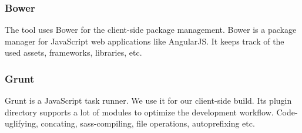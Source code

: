\subsubsection{Bower}
The tool uses Bower for the client-side package management. Bower is a package manager for JavaScript web applications like AngularJS. It keeps track of the used assets, frameworks, libraries, etc. \cite{bower}  

\subsubsection{Grunt}
Grunt is a JavaScript task runner. We use it for our client-side build. Its plugin directory supports a lot of modules to optimize the development workflow. Code-uglifying, concating, sass-compiling, file operations, autoprefixing etc. \cite{grunt} 

